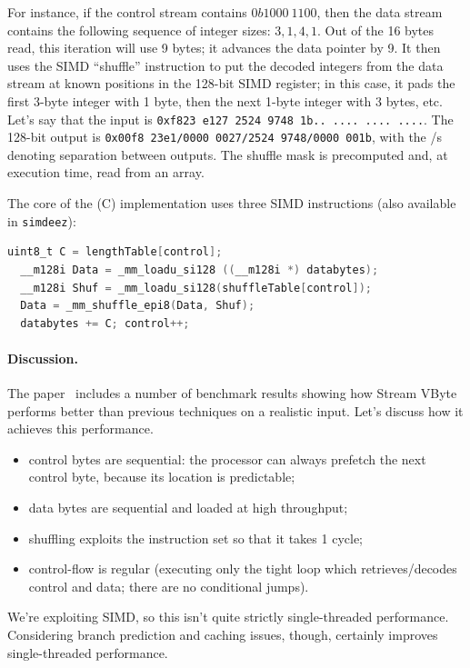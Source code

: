 \documentclass[a4paper]{report}
\newcommand{\CPP}{C\nolinebreak\hspace{-.05em}\raisebox{.4ex}{\tiny\bf +}\nolinebreak\hspace{-.10em}\raisebox{.4ex}{\tiny\bf +}}
\def\CPP{{C\nolinebreak[4]\hspace{-.05em}\raisebox{.4ex}{\tiny\bf ++}}}
\begin{document}
For instance, if the control stream contains $0b1000~1100$, then the data stream
contains the following sequence of integer sizes: $3, 1, 4, 1$. Out of the 16 bytes read,
this iteration will use 9 bytes; it advances the data pointer by 9. It then uses the SIMD
``shuffle'' instruction to put the decoded integers from the data stream at known positions in the
128-bit SIMD register; in this case, it pads the first 3-byte integer with 1 byte, then
the next 1-byte integer with 3 bytes, etc. Let's say that the input is
{\tt 0xf823~e127~2524~9748~1b..~....~....~....}. The 128-bit output is
{\tt 0x00f8~23e1/0000~0027/2524 9748/0000~001b}, with the /s denoting separation
between outputs. The shuffle mask is precomputed and, at
execution time, read from an array.

The core of the (\CPP) implementation uses three SIMD instructions (also available in \texttt{simdeez}):
\begin{lstlisting}[language=C]
  uint8_t C = lengthTable[control];
  __m128i Data = _mm_loadu_si128 ((__m128i *) databytes);
  __m128i Shuf = _mm_loadu_si128(shuffleTable[control]);
  Data = _mm_shuffle_epi8(Data, Shuf);
  databytes += C; control++;
\end{lstlisting}

\paragraph{Discussion.} The paper~\cite{LEMIRE20181} includes a number of benchmark results
showing how Stream VByte performs better than previous techniques on a realistic input.
Let's discuss how it achieves this performance.

\begin{itemize}[noitemsep]
\item control bytes are sequential: the processor can always prefetch the next control byte, because
its location is predictable;
\item data bytes are sequential and loaded at high throughput;
\item shuffling exploits the instruction set so that it takes 1 cycle;
\item control-flow is regular (executing only the tight loop which retrieves/decodes control
and data; there are no conditional jumps).
\end{itemize}
We're exploiting SIMD, so this isn't quite strictly single-threaded performance.
Considering branch prediction and caching issues, though,
certainly improves single-threaded performance.
\end{document}
